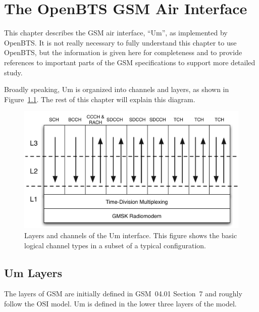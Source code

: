 \documentclass[11pt,openany]{book}
\begin{document}
\chapter{The OpenBTS GSM Air Interface}
\label{chap:Um}
This chapter describes the GSM air interface, ``Um'', as implemented by OpenBTS.
It is not really necessary to fully understand this chapter to use OpenBTS, but the information is given here for completeness and to provide references to important parts of the GSM specifications to support more detailed study.

Broadly speaking, Um is organized into channels and layers, as shown in Figure~\ref{fig:GSMLayers}.
The rest of this chapter will explain this diagram.

\begin{figure}[htbp]
\begin{center}
\includegraphics[width=6in]{GSMLayers.pdf}
\caption{Layers and channels of the Um interface.  This figure shows the basic logical channel types in a subset of a typical configuration.}
\label{fig:GSMLayers}
\end{center}
\end{figure}


\section{Um Layers}
The layers of GSM are initially defined in GSM~04.01 Section~7 and roughly follow the OSI model. Um is defined in the lower three layers of the model.
\end{document}
